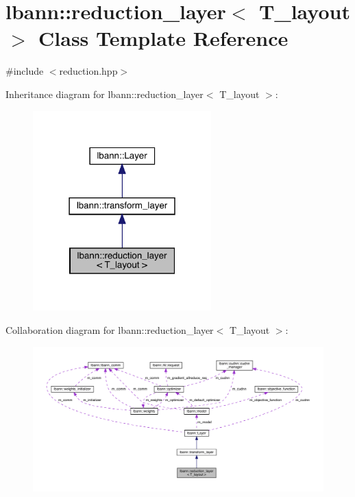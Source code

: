 \hypertarget{classlbann_1_1reduction__layer}{}\section{lbann\+:\+:reduction\+\_\+layer$<$ T\+\_\+layout $>$ Class Template Reference}
\label{classlbann_1_1reduction__layer}


{\ttfamily \#include $<$reduction.\+hpp$>$}



Inheritance diagram for lbann\+:\+:reduction\+\_\+layer$<$ T\+\_\+layout $>$\+:\nopagebreak
\begin{figure}[H]
\begin{center}
\leavevmode
\includegraphics[width=195pt]{classlbann_1_1reduction__layer__inherit__graph}
\end{center}
\end{figure}


Collaboration diagram for lbann\+:\+:reduction\+\_\+layer$<$ T\+\_\+layout $>$\+:\nopagebreak
\begin{figure}[H]
\begin{center}
\leavevmode
\includegraphics[width=350pt]{classlbann_1_1reduction__layer__coll__graph}
\end{center}
\end{figure}
